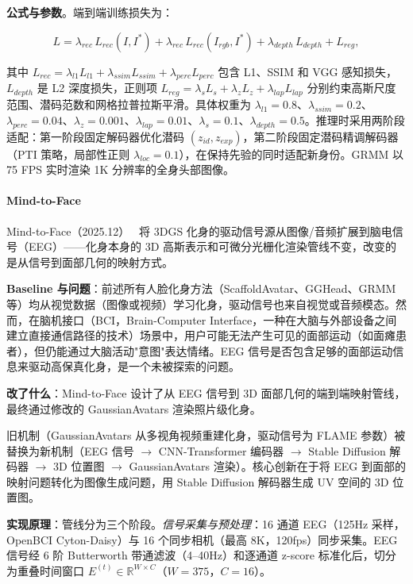 \textbf{公式与参数}。端到端训练损失为：

\[
L = \lambda_{rec}\,L_{rec}(I, I^*) + \lambda_{rec}\,L_{rec}(I_{rgb}, I^*) + \lambda_{depth}\,L_{depth} + L_{reg},
\]

其中 $L_{rec} = \lambda_{l1} L_{l1} + \lambda_{ssim} L_{ssim} + \lambda_{perc} L_{perc}$ 包含 L1、SSIM 和 VGG 感知损失，$L_{depth}$ 是 L2 深度损失，正则项 $L_{reg} = \lambda_s L_s + \lambda_z L_z + \lambda_{lap} L_{lap}$ 分别约束高斯尺度范围、潜码范数和网格拉普拉斯平滑。具体权重为 $\lambda_{l1} = 0.8$、$\lambda_{ssim} = 0.2$、$\lambda_{perc} = 0.04$、$\lambda_z = 0.001$、$\lambda_{lap} = 0.01$、$\lambda_s = 0.1$、$\lambda_{depth} = 0.5$。推理时采用两阶段适配：第一阶段固定解码器优化潜码 $(z_{id}, z_{exp})$，第二阶段固定潜码精调解码器（PTI 策略，局部性正则 $\lambda_{loc} = 0.1$），在保持先验的同时适配新身份。GRMM 以 75 FPS 实时渲染 1K 分辨率的全身头部图像。

\paragraph{Mind-to-Face}

Mind-to-Face（2025.12）~\cite{2512_04313} 将 3DGS 化身的驱动信号源从图像/音频扩展到脑电信号（EEG）——化身本身的 3D 高斯表示和可微分光栅化渲染管线不变，改变的是从信号到面部几何的映射方式。

\textbf{Baseline 与问题}：前述所有人脸化身方法（ScaffoldAvatar、GGHead、GRMM 等）均从视觉数据（图像或视频）学习化身，驱动信号也来自视觉或音频模态。然而，在脑机接口（BCI，Brain-Computer Interface，一种在大脑与外部设备之间建立直接通信路径的技术）场景中，用户可能无法产生可见的面部运动（如面瘫患者），但仍能通过大脑活动"意图"表达情绪。EEG 信号是否包含足够的面部运动信息来驱动高保真化身，是一个未被探索的问题。

\textbf{改了什么}：Mind-to-Face 设计了从 EEG 信号到 3D 面部几何的端到端映射管线，最终通过修改的 GaussianAvatars 渲染照片级化身。

旧机制（GaussianAvatars 从多视角视频重建化身，驱动信号为 FLAME 参数）被替换为新机制（EEG 信号 $\to$ CNN-Transformer 编码器 $\to$ Stable Diffusion 解码器 $\to$ 3D 位置图 $\to$ GaussianAvatars 渲染）。核心创新在于将 EEG 到面部的映射问题转化为图像生成问题，用 Stable Diffusion 解码器生成 UV 空间的 3D 位置图。

\textbf{实现原理}：管线分为三个阶段。\textit{信号采集与预处理}：16 通道 EEG（125Hz 采样，OpenBCI Cyton-Daisy）与 16 个同步相机（最高 8K，120fps）同步采集。EEG 信号经 6 阶 Butterworth 带通滤波（4--40Hz）和逐通道 z-score 标准化后，切分为重叠时间窗口 $E^{(t)} \in \mathbb{R}^{W \times C}$（$W=375$，$C=16$）。


